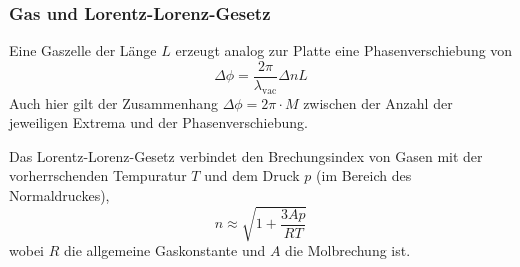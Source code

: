         \subsubsection{Gas und Lorentz-Lorenz-Gesetz}
            Eine Gaszelle der Länge $L$ erzeugt analog zur Platte eine Phasenverschiebung von
            \begin{equation}
                \Delta \phi = \frac{2\pi}{\lambda_{\text{vac}}} \Delta n L
                \label{eqn:n_gas}
            \end{equation}
            Auch hier gilt der Zusammenhang $\Delta \phi = 2\pi \cdot M$ zwischen der Anzahl der jeweiligen Extrema und der Phasenverschiebung.

            Das Lorentz-Lorenz-Gesetz verbindet den Brechungsindex von Gasen mit der vorherrschenden Tempuratur $T$ und dem Druck $p$ (im Bereich des Normaldruckes),
            \begin{equation}
                n \approx \sqrt{1 + \frac{3 A p}{R T}}
                \label{eqn:lorentz}
            \end{equation}
            wobei $R$ die allgemeine Gaskonstante und $A$ die Molbrechung ist.